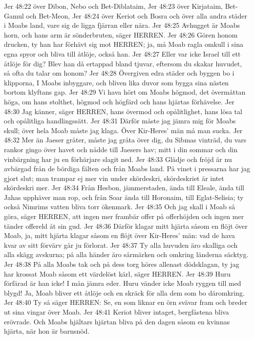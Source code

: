 Jer 48:22  över Dibon, Nebo och Bet-Diblataim,
Jer 48:23  över Kirjataim, Bet-Gamul och Bet-Meon,
Jer 48:24  över Keriot och Bosra och över alla andra städer i Moabs land, vare sig de ligga fjärran eller nära.
Jer 48:25  Avhugget är Moabs horn, och hans arm är sönderbruten, säger HERREN.
Jer 48:26  Gören honom drucken, ty han har förhävt sig mot HERREN; ja, må Moab ragla omkull i sina egna spyor och bliva till åtlöje, också han.
Jer 48:27  Eller var icke Israel till ett åtlöje för dig? Blev han då ertappad bland tjuvar, eftersom du skakar huvudet, så ofta du talar om honom?
Jer 48:28  Övergiven edra städer och byggen bo i klipporna, I Moabs inbyggare, och bliven lika duvor som bygga sina nästen bortom klyftans gap.
Jer 48:29  Vi hava hört om Moabs högmod, det övermåttan höga, om hans stolthet, högmod och högfärd och hans hjärtas förhävelse.
Jer 48:30  Jag känner, säger HERREN, hans övermod och opålitlighet, hans lösa tal och opålitliga handlingssätt.
Jer 48:31  Därför måste jag jämra mig för Moabs skull; över hela Moab måste jag klaga. Över Kir-Heres' män må man sucka.
Jer 48:32  Mer än Jaeser gråter, måste jag gråta över dig, du Sibmas vinträd, du vars rankor gingo över havet och nådde till Jaesers hav; mitt i din sommar och din vinbärgning har ju en förhärjare slagit ned.
Jer 48:33  Glädje och fröjd är nu avbärgad från de bördiga fälten och från Moabs land. På vinet i pressarna har jag gjort slut; man trampar ej mer vin under skördeskri, skördeskriet är intet skördeskri mer.
Jer 48:34  Från Hesbon, jämmerstaden, ända till Eleale, ända till Jahas upphäver man rop, och från Soar ända till Horonaim, till Eglat-Selisia; ty också Nimrims vatten bliva torr ökenmark.
Jer 48:35  Och jag skall i Moab så göra, säger HERREN, att ingen mer frambär offer på offerhöjden och ingen mer tänder offereld åt sin gud.
Jer 48:36  Därför klagar mitt hjärta såsom en flöjt över Moab, ja, mitt hjärta klagar såsom en flöjt över Kir-Heres' män: vad de hava kvar av sitt förvärv går ju förlorat.
Jer 48:37  Ty alla huvuden äro skalliga och alla skägg avskurna; på alla händer äro sårmärken och omkring länderna säcktyg.
Jer 48:38  På alla Moabs tak och på dess torg höres allenast dödsklagan, ty jag har krossat Moab såsom ett värdelöst kärl, säger HERREN.
Jer 48:39  Huru förfärad är han icke! I mån jämra eder. Huru vänder icke Moab ryggen till med blygd! Ja, Moab bliver ett åtlöje och en skräck för alla dem som bo däromkring.
Jer 48:40  Ty så säger HERREN: Se, en som liknar en örn svävar fram och breder ut sina vingar över Moab.
Jer 48:41  Keriot bliver intaget, bergfästena bliva erövrade. Och Moabs hjältars hjärtan bliva på den dagen såsom en kvinnas hjärta, när hon är barnsnöd.

